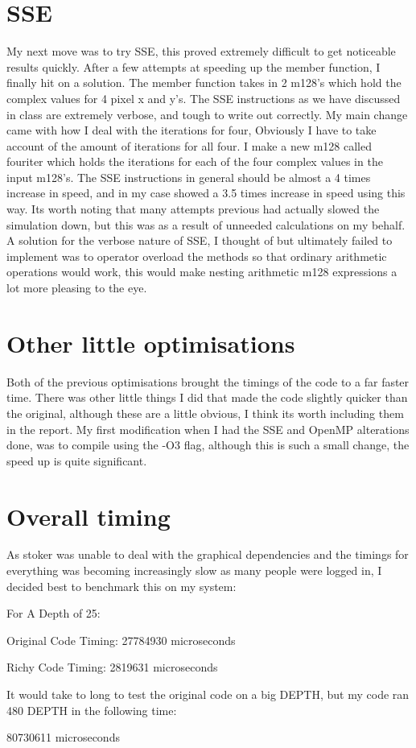 \documentclass{article}
\begin{document}
\section*{ SSE}


My next move was to try SSE, this proved extremely difficult to get noticeable results quickly. After a few attempts at speeding up the member function, I finally hit on a solution. The member function takes in 2 m128's which hold the complex values for 4 pixel x and y's. The SSE instructions as we have discussed in class are extremely verbose, and tough to write out correctly. My main change came with how I deal with the iterations for four, Obviously I have to take account of the amount of iterations for all four. I make a new m128 called four\textunderscore iter which holds the iterations for each of the four complex values in the input m128's. The SSE instructions in general should be almost a 4 times increase in speed, and in my case showed a 3.5 times increase in speed using this way. Its worth noting that many attempts previous had actually slowed the simulation down, but this was as a result of unneeded calculations on my behalf. A solution for the verbose nature of SSE, I thought of but ultimately failed to implement was to operator overload the methods so that ordinary arithmetic operations would work, this would make nesting arithmetic m128 expressions a lot more pleasing to the eye.



\section*{ Other little optimisations}


Both of the previous optimisations brought the timings of the code to a far faster time. There was other little things I did that made the code slightly quicker than the original, although these are a little obvious, I think its worth including them in the report. My first modification when I had the SSE and OpenMP alterations done, was to compile using the -O3 flag, although this is such a small change, the speed up is quite significant.



\section*{ Overall timing}


As stoker was unable to deal with the graphical dependencies and the timings for everything was becoming increasingly slow as many people were logged in, I decided best to benchmark this on my system:



For A Depth of 25:

Original Code Timing:	27784930 microseconds

Richy Code Timing:	2819631 microseconds



It would take to long to test the original code on a big DEPTH, but my code ran 480 DEPTH in the following time:

80730611 microseconds
\end{document}
